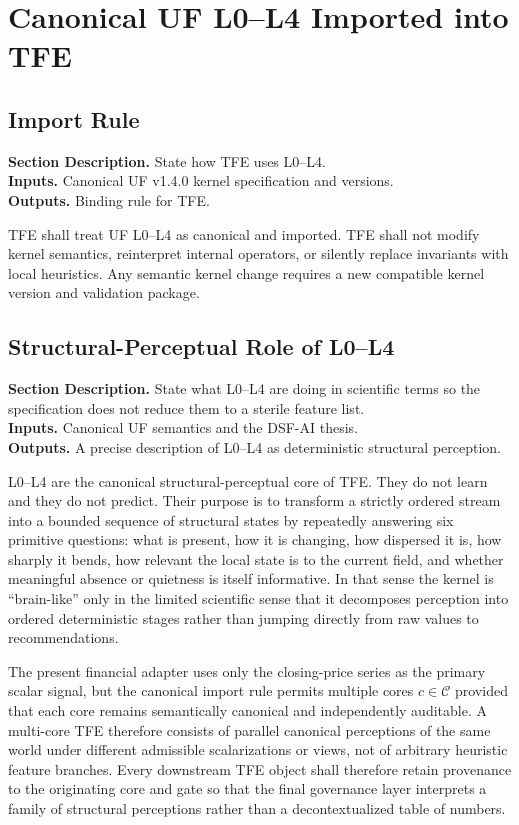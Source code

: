 \documentclass[11pt]{report}
\newcommand{\meta}[3]{\textbf{Section Description.} #1\\
\textbf{Inputs.} #2\\
\textbf{Outputs.} #3\par}
\begin{document}
\chapter{Canonical UF L0--L4 Imported into TFE}
\section{Import Rule}
\meta{State how TFE uses L0--L4.}{Canonical UF v1.4.0 kernel specification and versions.}{Binding rule for TFE.}

TFE shall treat UF L0--L4 as canonical and imported. TFE shall not modify kernel semantics, reinterpret internal operators, or silently replace invariants with local heuristics. Any semantic kernel change requires a new compatible kernel version and validation package.


\section{Structural-Perceptual Role of L0--L4}
\meta{State what L0--L4 are doing in scientific terms so the specification does not reduce them to a sterile feature list.}{Canonical UF semantics and the DSF-AI thesis.}{A precise description of L0--L4 as deterministic structural perception.}

L0--L4 are the canonical structural-perceptual core of TFE. They do not learn and they do not predict. Their purpose is to transform a strictly ordered stream into a bounded sequence of structural states by repeatedly answering six primitive questions: what is present, how it is changing, how dispersed it is, how sharply it bends, how relevant the local state is to the current field, and whether meaningful absence or quietness is itself informative. In that sense the kernel is ``brain-like'' only in the limited scientific sense that it decomposes perception into ordered deterministic stages rather than jumping directly from raw values to recommendations.

The present financial adapter uses only the closing-price series as the primary scalar signal, but the canonical import rule permits multiple cores $c\in\mathcal{C}$ provided that each core remains semantically canonical and independently auditable. A multi-core TFE therefore consists of parallel canonical perceptions of the same world under different admissible scalarizations or views, not of arbitrary heuristic feature branches. Every downstream TFE object shall therefore retain provenance to the originating core and gate so that the final governance layer interprets a family of structural perceptions rather than a decontextualized table of numbers.
\end{document}
